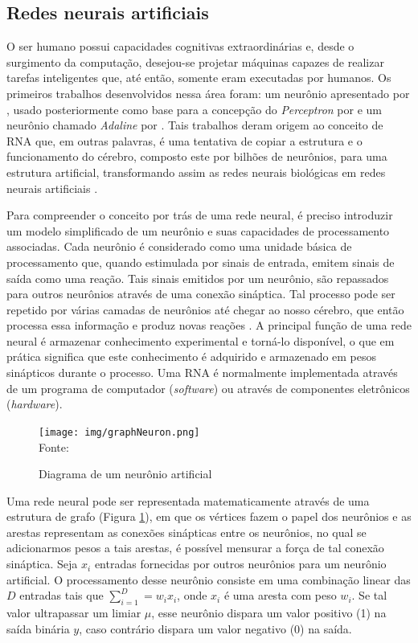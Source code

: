\subsection{Redes neurais artificiais}
O ser humano possui capacidades cognitivas extraordinárias e, desde o surgimento da computação, desejou-se projetar máquinas capazes de realizar tarefas inteligentes que, até então, somente eram  executadas por humanos. Os primeiros trabalhos desenvolvidos nessa área foram: um neurônio apresentado por \cite{mcculloch1943logical}, usado posteriormente como base para a concepção do  \textit{Perceptron} por \cite{rosenblatt1958perceptron} e um neurônio chamado \textit{Adaline} por \cite{widrow1960adaptive}. Tais trabalhos deram origem ao conceito de RNA que, em outras palavras, é uma tentativa de copiar a estrutura e o funcionamento do cérebro, composto este por bilhões de neurônios, para uma estrutura artificial, transformando assim as redes neurais biológicas em redes neurais artificiais \citep{Rauber2005}.

Para compreender o conceito por trás de uma rede neural, é preciso introduzir um modelo simplificado de um neurônio e suas capacidades de processamento associadas. Cada neurônio é considerado como uma unidade básica de processamento que, quando estimulada por sinais de entrada, emitem sinais de saída como uma reação. Tais sinais emitidos por um neurônio, são repassados para outros neurônios através de uma conexão sináptica. Tal processo pode ser repetido por várias camadas de neurônios até chegar ao nosso cérebro, que então processa essa informação e produz novas reações \citep{baeza1999modern}. A principal função de uma rede neural é armazenar conhecimento experimental e torná-lo disponível, o que em prática significa que este conhecimento é adquirido e armazenado em pesos sinápticos durante o processo. Uma RNA é normalmente implementada através de um programa de computador (\textit{software}) ou através de componentes eletrônicos (\textit{hardware}).

\begin{figure}[ht!]
\caption{Diagrama de um neurônio artificial}
\label{fig:graphNeuron}
\centering
\texttt{[image: img/graphNeuron.png]}
{\fontsize{11pt}{\baselineskip}\selectfont
\\Fonte: \cite{Rauber2005}
}
\end{figure}

 Uma rede neural pode ser representada matematicamente através de uma estrutura de grafo (Figura \ref{fig:graphNeuron}), em que os vértices fazem o papel dos neurônios e as arestas representam as conexões sinápticas entre os neurônios, no qual se adicionarmos pesos a tais arestas, é possível mensurar a força de tal conexão sináptica. Seja $x_i$ entradas fornecidas por outros neurônios para um neurônio artificial. O processamento desse neurônio consiste em uma combinação linear das $D$ entradas tais que $\sum_{i=1}^{D} = w_i x_i$, onde $x_i$ é uma aresta com peso $w_i$. Se tal valor ultrapassar um limiar $\mu$, esse neurônio dispara um valor positivo (1) na saída binária $y$, caso contrário dispara um valor negativo (0) na saída. 
 
